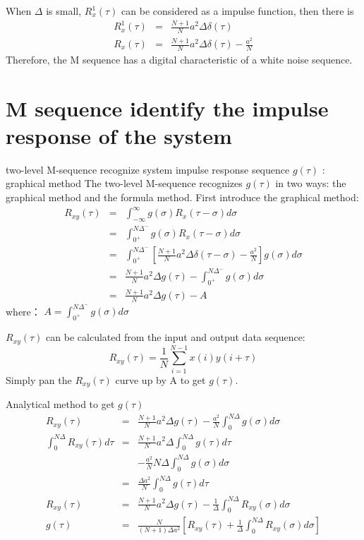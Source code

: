 \begin{frame}
When $\Delta$ is small, $R_x^1(\tau)$ can be considered as a impulse function, then there is
\begin{eqnarray*}
R_x^1(\tau) &=& \frac{N+1}{N}a^2\Delta\delta(\tau) \\
R_x(\tau) &=& \frac{N+1}{N}a^2\Delta\delta(\tau)-\frac{a^2}{N}
\end{eqnarray*}
Therefore, the M sequence has a digital characteristic of a white noise sequence.
\end{frame}


\section{M sequence  identify the impulse response of the system}

\begin{frame}{ two-level M-sequence recognize system impulse response sequence $g(\tau)$ : graphical method}
The two-level M-sequence recognizes $g(\tau)$ in two ways: the graphical method and the formula method. First introduce the graphical method:
\begin{eqnarray*}
R_{xy}(\tau) &=&  \int_{-\infty}^{\infty}g(\sigma)R_x(\tau-\sigma)d\sigma  \\
&=& \int_{0^+}^{N\Delta^-}g(\sigma)R_x(\tau-\sigma)d\sigma \\
&=& \int_{0^+}^{N\Delta^-}\left[\frac{N+1}{N}a^2\Delta\delta(\tau-\sigma)-\frac{a^2}{N}\right]g(\sigma)d\sigma \\
&=& \frac{N+1}{N}a^2\Delta g(\tau)-\int_{0^+}^{N\Delta^-}g(\sigma)d\sigma \\
&=& \frac{N+1}{N}a^2\Delta g(\tau)-A 
\end{eqnarray*}
where：
$
A=\int_{0^+}^{N\Delta^-}g(\sigma)d\sigma 
$
\end{frame}

\begin{frame}
$R_{xy}(\tau)$ can be calculated from the input and output data sequence:
$$
R_{xy}(\tau)=\frac{1}{N}\sum_{i=1}^{N-1}x(i)y(i+\tau)
$$
Simply pan the $R_{xy}(\tau)$ curve up by A to get $g(\tau)$.
\end{frame}

\begin{frame}{Analytical method to get $g(\tau)$}
\begin{eqnarray*}
R_{xy}(\tau) &=& \frac{N+1}{N}a^2\Delta g(\tau)-\frac{a^2}{N}\int_0^{N\Delta}g(\sigma)d\sigma \\
\int_0^{N\Delta}R_{xy}(\tau)d\tau &=& \frac{N+1}{N}a^2\Delta \int_0^{N\Delta}g(\tau)d\tau \\
&& -\frac{a^2}{N}N\Delta\int_0^{N\Delta}g(\sigma)d\sigma \\
&=&\frac{\Delta a^2}{N}\int_0^{N\Delta}g(\tau)d\tau  \\
R_{xy}(\tau) &=& \frac{N+1}{N}a^2\Delta g(\tau)-\frac{1}{\Delta}\int_0^{N\Delta}R_{xy}(\sigma)d\sigma \\
g(\tau)&=&\frac{N}{(N+1)\Delta a^2}\left[R_{xy}(\tau)+\frac{1}{\Delta}\int_0^{N\Delta}R_{xy}(\sigma)d\sigma\right]
\end{eqnarray*}
\end{frame}


